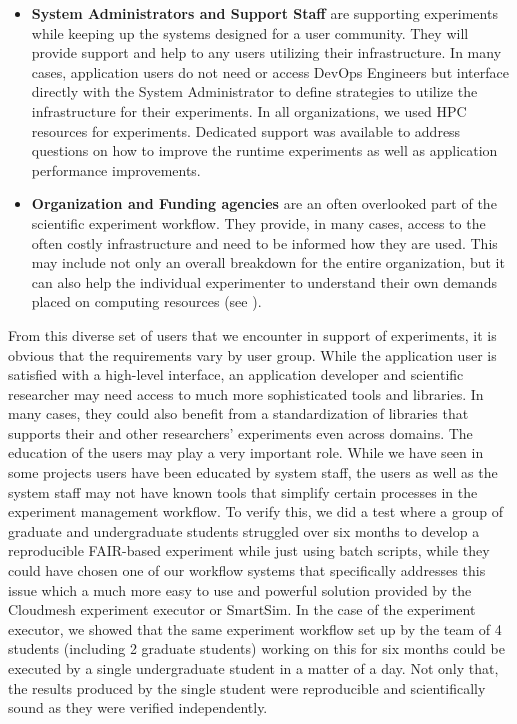 \documentclass[utf8]{FrontiersinVancouver} %
\begin{document}
\begin{itemize}
    \item {\bf System Administrators and Support Staff} are supporting experiments while keeping up the systems designed for a user community. They will provide support and help to any users utilizing their infrastructure. In many cases, application users do not need or access DevOps Engineers but interface directly with the System Administrator to define strategies to utilize the infrastructure for their experiments. In all organizations, we used HPC resources for experiments. Dedicated support was available to address questions on how to improve the runtime experiments as well as application performance improvements.
    \item {\bf Organization and Funding agencies} are an often overlooked part of the scientific experiment workflow. They provide, in many cases, access to the often costly infrastructure and need to be informed how they are used. This may include not only an overall breakdown for the entire organization, but it can also help the individual experimenter to understand their own demands placed on computing resources (see \citep{las-15-tas}). 
\end{itemize}

From this diverse set of users that we encounter in support of experiments, it is obvious that the requirements vary by user group. While the application user is satisfied with a high-level interface, an application developer and scientific researcher may need access to much more sophisticated tools and libraries. In many cases, they could also benefit from a standardization of libraries that supports their and other researchers' experiments even across domains. The education of the users may play a very important role. While we have seen in some projects users have been educated by system staff, the users as well as the system staff may not have known tools that simplify certain processes in the experiment management workflow. To verify this, we did a test where a group of graduate and undergraduate students struggled over six months to develop a reproducible FAIR-based experiment while just using batch scripts, while they could have chosen one of our workflow systems that specifically addresses this issue which a much more easy to use and powerful solution provided by the Cloudmesh experiment executor or SmartSim. In the case of the experiment executor, we showed that the same experiment workflow set up by the team of 4 students (including 2 graduate students) working on this for six months could be executed by a single undergraduate student in a matter of a day. Not only that, the results produced by the single student were reproducible and scientifically sound as they were verified independently.
\end{document}
